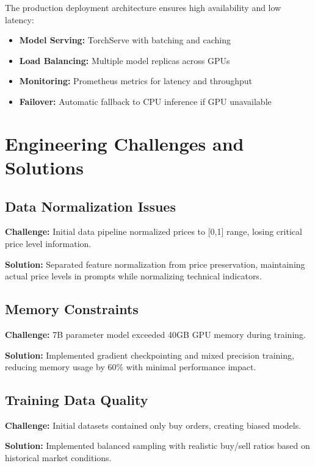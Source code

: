 \documentclass{report}
\begin{document}
The production deployment architecture ensures high availability and low latency:

\begin{itemize}
    \item \textbf{Model Serving:} TorchServe with batching and caching
    \item \textbf{Load Balancing:} Multiple model replicas across GPUs
    \item \textbf{Monitoring:} Prometheus metrics for latency and throughput
    \item \textbf{Failover:} Automatic fallback to CPU inference if GPU unavailable
\end{itemize}

\section{Engineering Challenges and Solutions}

\subsection{Data Normalization Issues}

\textbf{Challenge:} Initial data pipeline normalized prices to [0,1] range, losing critical price level information.

\textbf{Solution:} Separated feature normalization from price preservation, maintaining actual price levels in prompts while normalizing technical indicators.

\subsection{Memory Constraints}

\textbf{Challenge:} 7B parameter model exceeded 40GB GPU memory during training.

\textbf{Solution:} Implemented gradient checkpointing and mixed precision training, reducing memory usage by 60\% with minimal performance impact.

\subsection{Training Data Quality}

\textbf{Challenge:} Initial datasets contained only buy orders, creating biased models.

\textbf{Solution:} Implemented balanced sampling with realistic buy/sell ratios based on historical market conditions.
\end{document}
